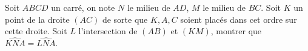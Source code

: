 Soit $ABCD$ un carré, on note $N$ le milieu de $AD$, $M$ le milieu de $BC$. Soit $K$ un point de la droite $(AC)$ de sorte que $K, A, C$ soient placés dans cet ordre sur cette droite. Soit $L$ l'intersection de $(AB)$ et $(KM)$, montrer que $\widehat{KNA}=\widehat{LNA}$.